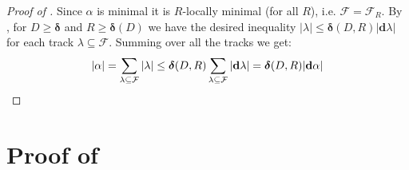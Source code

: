 \documentclass{amsart}
\numberwithin{equation}{section}
\theoremstyle{definition}
\newcommand{\bfd}{\mathbf{d}}
\newcommand{\calF}{\mathcal{F}}
\newcommand{\bdelta}{{\boldsymbol\delta}}
\begin{document}
\begin{proof}[Proof of ]
Since $\alpha$ is minimal it is $R$-locally minimal (for all $R$), i.e. $\calF = \calF_R$. By , for $D\ge \bdelta$ and $R\ge \bdelta(D)$ we have the desired inequality $|\lambda| \le \bdelta(D,R)|\bfd \lambda|$ for each track $\lambda\subseteq \calF$. Summing over all the tracks we get:
\begin{equation*}|\alpha| = \sum_{\lambda\subseteq \calF} |\lambda|\le \bdelta(D,R) \sum _{\lambda\subseteq \calF}|\bfd \lambda| =\bdelta(D,R)|\bfd \alpha|\qedhere\end{equation*}
\end{proof}

\section{Proof of }
\label{sec: pf of main theorem}
\end{document}
